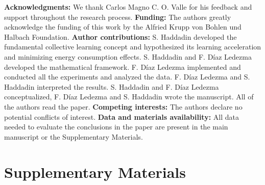 \documentclass[12pt]{article}
\begin{document}
\textbf{Acknowledgments:}
We thank Carlos Magno C. O. Valle for his feedback and support throughout the research process. \textbf{Funding:} The authors greatly acknowledge the funding of this work by the Alfried Krupp von Bohlen und Halbach Foundation. \textbf{Author contributions:} S. Haddadin developed the fundamental collective learning concept and hypothesized its learning acceleration and minimizing energy consumption effects.  S. Haddadin and F. Díaz Ledezma developed the mathematical framework. F. Díaz Ledezma implemented and conducted all the experiments and analyzed the data. F. Díaz Ledezma and S. Haddadin interpreted the results. S. Haddadin and F. Díaz Ledezma conceptualized, F. Díaz Ledezma and S. Haddadin wrote the manuscript. All of the authors read the paper. \textbf{Competing interests:} The authors declare no potential conflicts of interest. \textbf{Data and materials availability:} All data needed to evaluate the conclusions in the paper are present in the main manuscript or the Supplementary Materials. %

 \newpage
 \beginsupplement
 \section*{Supplementary Materials}\label{sec:supplementary_materials}
 
\end{document}
